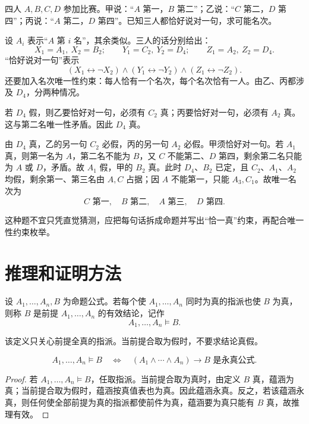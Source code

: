 \begin{example}[title={名次推断的逻辑建模}]\label{ch1-ranking}
四人 $A,B,C,D$ 参加比赛。甲说：“$A$ 第一，$B$ 第二”；乙说：“$C$ 第二，$D$ 第四”；丙说：“$A$ 第二，$D$ 第四”。已知三人都恰好说对一句，求可能名次。
\begin{solution}
设 $A_i$ 表示“$A$ 第 $i$ 名”，其余类似。三人的话分别给出：
\[
X_1=A_1,\ X_2=B_2;\qquad
Y_1=C_2,\ Y_2=D_4;\qquad
Z_1=A_2,\ Z_2=D_4.
\]
“恰好说对一句”表示
\[
(X_1\leftrightarrow\neg X_2)\land
(Y_1\leftrightarrow\neg Y_2)\land
(Z_1\leftrightarrow\neg Z_2).
\]
还要加入名次唯一性约束：每人恰有一个名次，每个名次恰有一人。由乙、丙都涉及 $D_4$，分两种情况。

若 $D_4$ 假，则乙要恰好对一句，必须有 $C_2$ 真；丙要恰好对一句，必须有 $A_2$ 真。这与第二名唯一性矛盾。因此 $D_4$ 真。

由 $D_4$ 真，乙的另一句 $C_2$ 必假，丙的另一句 $A_2$ 必假。甲须恰好对一句。若 $A_1$ 真，则第一名为 $A$，第二名不能为 $B$，又 $C$ 不能第二、$D$ 第四，剩余第二名只能为 $A$ 或 $D$，矛盾。故 $A_1$ 假，甲的 $B_2$ 真。此时 $D_4$、$B_2$ 已定，且 $C_2$、$A_1$、$A_2$ 均假，剩余第一、第三名由 $A,C$ 占据；因 $A$ 不能第一，只能 $A_3,C_1$。故唯一名次为
\[
C\text{ 第一},\quad B\text{ 第二},\quad A\text{ 第三},\quad D\text{ 第四}.
\]

这种题不宜只凭直觉猜测，应把每句话拆成命题并写出“恰一真”约束，再配合唯一性约束枚举。
\end{solution}
\end{example}

\section{推理和证明方法}

\begin{definition}[有效推理]\label{ch1-valid-argument}
设 $A_1,\ldots,A_n,B$ 为命题公式。若每个使 $A_1,\ldots,A_n$ 同时为真的指派也使 $B$ 为真，则称 $B$ 是前提 $A_1,\ldots,A_n$ 的有效结论，记作
\[
A_1,\ldots,A_n\vDash B.
\]
\end{definition}

该定义只关心前提全真的指派。当前提合取为假时，不要求结论真假。

\begin{theorem}[推理的永真式判据]\label{ch1-argument-tautology}
\[
A_1,\ldots,A_n\vDash B
\quad\Longleftrightarrow\quad
(A_1\land\cdots\land A_n)\to B\text{ 是永真公式}.
\]
\end{theorem}
\begin{proof}
若 $A_1,\ldots,A_n\vDash B$，任取指派。当前提合取为真时，由定义 $B$ 真，蕴涵为真；当前提合取为假时，蕴涵按真值表也为真。因此蕴涵永真。反之，若该蕴涵永真，则任何使全部前提为真的指派都使前件为真，蕴涵要为真只能有 $B$ 真，故推理有效。
\end{proof}


